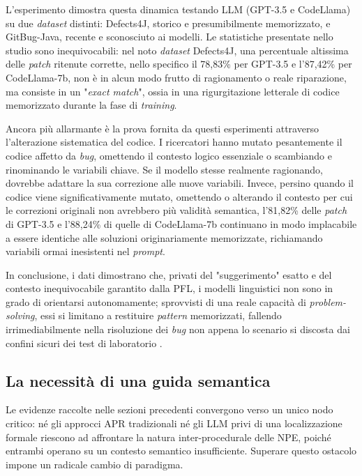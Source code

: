 L'esperimento dimostra questa dinamica testando LLM (GPT-3.5 e CodeLlama) su due
\textit{dataset} distinti: Defects4J, storico e presumibilmente memorizzato, e
GitBug-Java, recente e sconosciuto ai modelli.
Le statistiche presentate nello studio sono inequivocabili: nel noto \textit{dataset} Defects4J,
una percentuale altissima delle \textit{patch} ritenute corrette, nello specifico il
78,83\% per GPT-3.5 e l'87,42\% per CodeLlama-7b, non è in alcun modo frutto di ragionamento o
reale riparazione, ma consiste in un "\textit{exact match}", ossia in una rigurgitazione
letterale di codice memorizzato durante la fase di \textit{training}.

Ancora più allarmante è la prova fornita da questi esperimenti attraverso
l'alterazione sistematica del codice. I ricercatori hanno mutato pesantemente il codice
affetto da \textit{bug}, omettendo il contesto logico essenziale o scambiando e
rinominando le variabili chiave.
Se il modello stesse realmente ragionando, dovrebbe adattare la sua correzione alle
nuove variabili.
Invece, persino quando il codice viene significativamente mutato, omettendo o
alterando il contesto per cui le correzioni originali non avrebbero più validità semantica,
l'81,82\% delle \textit{patch} di GPT-3.5 e l'88,24\% di quelle di CodeLlama-7b continuano
in modo implacabile a essere identiche alle soluzioni originariamente memorizzate,
richiamando variabili ormai inesistenti nel \textit{prompt}.

In conclusione, i dati dimostrano che, privati del "suggerimento" esatto e del contesto
inequivocabile garantito dalla PFL, i modelli linguistici non sono in grado di orientarsi
autonomamente; sprovvisti di una reale capacità di \textit{problem-solving}, essi si limitano a
restituire \textit{pattern} memorizzati, fallendo irrimediabilmente nella risoluzione dei \textit{bug}
non appena lo scenario si discosta dai confini sicuri dei test di laboratorio \cite{kong2025demystifying}.

\subsection{La necessità di una guida semantica}

Le evidenze raccolte nelle sezioni precedenti convergono verso un unico nodo critico: né gli approcci 
APR tradizionali né gli LLM privi di una localizzazione formale riescono ad affrontare la natura 
inter-procedurale delle NPE, poiché entrambi operano su un contesto semantico insufficiente. 
Superare questo ostacolo impone un radicale cambio di paradigma.

